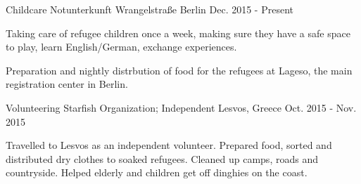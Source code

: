 

\begin{cventries}

  \cventry
    {Childcare} %
    {Notunterkunft Wrangelstraße} %
    {Berlin} %
    {Dec. 2015 - Present} %
    {
      \begin{cvitems} %
        \item Taking care of refugee children once a week, making sure they have a
        safe space to play, learn English/German, exchange experiences.
        \item Preparation and nightly distrbution of food for the refugees at Lageso, the
          main registration center in Berlin.
      \end{cvitems}
    }

  \cventry
    {Volunteering} %
    {Starfish Organization; Independent} %
    {Lesvos, Greece} %
    {Oct. 2015 - Nov. 2015} %
    {
      \begin{cvitems} %
        Travelled to Lesvos as an independent volunteer. Prepared food, sorted
        and distributed dry clothes to soaked refugees. Cleaned up camps, roads
        and countryside. Helped elderly and children get off dinghies on the coast.
      \end{cvitems}
    }

\end{cventries}
